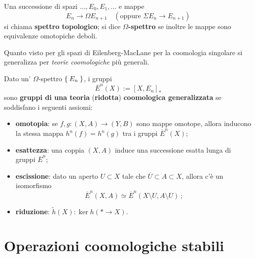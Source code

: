 \begin{df}
	Una successione di spazi $\dots, E_{0}, E_{1}, \dots$ e mappe
	\begin{equation*}
		E_{n} \longrightarrow \Omega E_{n+1}
		\quad (\text{oppure } \Sigma E_{n} \longrightarrow E_{n+1})
	\end{equation*}
	si chiama \textbf{spettro topologico};
	si dice \textbf{$\Omega$-spettro} se inoltre le mappe sono equivalenze omotopiche deboli.
\end{df}

Quanto visto per gli spazi di Eilenberg-MacLane per la coomologia singolare
si generalizza per \emph{teorie coomologiche} più generali.

\begin{df}
	Dato un' $\Omega$-spettro $\Set{E_{n}}$, i gruppi 
	\begin{equation*}
		\overline{E}^{n}(X) := [X,E_{n}]_{\ast}
	\end{equation*}
	sono \textbf{gruppi di una teoria} (\textbf{ridotta}) \textbf{coomologica generalizzata}
	se soddisfano i seguenti assiomi:
	\begin{itemize}
		\item \textbf{omotopia}: se $f,g:(X,A) \to (Y,B)$ sono mappe omotope, 
		allora inducono la stessa mappa $h^{n}(f) = h^{n}(g)$ tra i gruppi $\overline{E}^{n}(X)$;
		
		\item \textbf{esattezza}: una coppia $(X,A)$ induce una successione esatta
		lunga di gruppi $\overline{E}^{n}$;
		
		\item \textbf{escissione}: dato un aperto $U \subset X$ tale che 
		$\overline{U} \subset A \subset X$, allora c'è un isomorfismo
		\begin{equation*}
			\overline{E}^{n}(X,A) \simeq \overline{E}^{n}(X \setminus U, A \setminus U)\,;
		\end{equation*}
		\item \textbf{riduzione}: $\widetilde{h}(X) : \ker h(\ast \to X)$.
	\end{itemize}
\end{df}


\section{Operazioni coomologiche stabili}


